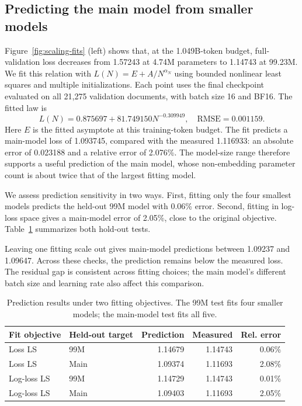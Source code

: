 \documentclass{article}
\begin{document}
\subsection{Predicting the main model from smaller models}
Figure~\ref{fig:scaling-fits} (left) shows that, at the 1.049B-token budget, full-validation loss decreases from 1.57243 at 4.74M parameters to 1.14743 at 99.23M. We fit this relation with $L(N)=E+A/N^{\alpha_N}$ using bounded nonlinear least squares and multiple initializations. Each point uses the final checkpoint evaluated on all 21,275 validation documents, with batch size 16 and BF16. The fitted law is
\[L(N)=0.875697+81.749150N^{-0.309949},\quad \mathrm{RMSE}=0.001159.\]
Here $E$ is the fitted asymptote at this training-token budget. The fit predicts a main-model loss of 1.093745, compared with the measured 1.116933: an absolute error of 0.023188 and a relative error of 2.076\%. The model-size range therefore supports a useful prediction of the main model, whose non-embedding parameter count is about twice that of the largest fitting model.

We assess prediction sensitivity in two ways. First, fitting only the four smallest models predicts the held-out 99M model with 0.06\% error. Second, fitting in log-loss space gives a main-model error of 2.05\%, close to the original objective. Table~\ref{tab:prediction} summarizes both hold-out tests.

Leaving one fitting scale out gives main-model predictions between 1.09237 and 1.09647. Across these checks, the prediction remains below the measured loss. The residual gap is consistent across fitting choices; the main model's different batch size and learning rate also affect this comparison.

\begin{table}[H]
\setlength{\abovecaptionskip}{7pt}\setlength{\belowcaptionskip}{7pt}
\centering\small\begin{tabular}{llrrr}\toprule Fit objective & Held-out target & Prediction & Measured & Rel. error\\\midrule
Loss LS & 99M & 1.14679 & 1.14743 & 0.06\%\\
Loss LS & Main & 1.09374 & 1.11693 & 2.08\%\\
Log-loss LS & 99M & 1.14729 & 1.14743 & 0.01\%\\
Log-loss LS & Main & 1.09403 & 1.11693 & 2.05\%\\
\bottomrule\end{tabular}\caption{Prediction results under two fitting objectives. The 99M test fits four smaller models; the main-model test fits all five.}\label{tab:prediction}\end{table}
\end{document}
